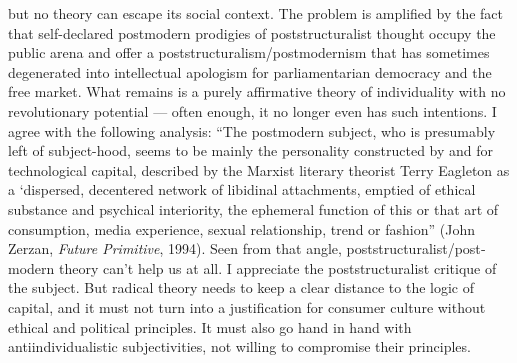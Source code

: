 {    but no theory can escape its social context. The problem is amplified by the
    fact that self-declared postmodern prodigies of poststructuralist thought
    occupy the public arena and offer a poststructuralism/postmodernism that has
    sometimes degenerated into intellectual apologism for parliamentarian
    democracy and the free market. What remains is a purely affirmative theory
    of individuality with no revolutionary potential — often enough, it no
    longer even has such intentions. I agree with the following analysis: “The
    postmodern subject, who is presumably left of subject-hood, seems to be
    mainly the personality constructed by and for technological capital,
    described by the Marxist literary theorist Terry Eagleton as a ‘dispersed,
    decentered network of libidinal attachments, emptied of ethical substance
    and psychical interiority, the ephemeral function of this or that art of
    consumption, media experience, sexual relationship, trend or fashion” (John
    Zerzan, \textit{Future Primitive}, 1994). Seen from that angle,
    poststructuralist/post­modern theory can’t help us at all. I appreciate the
    poststructuralist critique of the subject. But radical theory needs to keep
    a clear distance to the logic of capital, and it must not turn into a
    justification for consumer culture without ethical and political principles.
    It must also go hand in hand with antiindividualistic subjectivities, not
    willing to compromise their principles.

}
